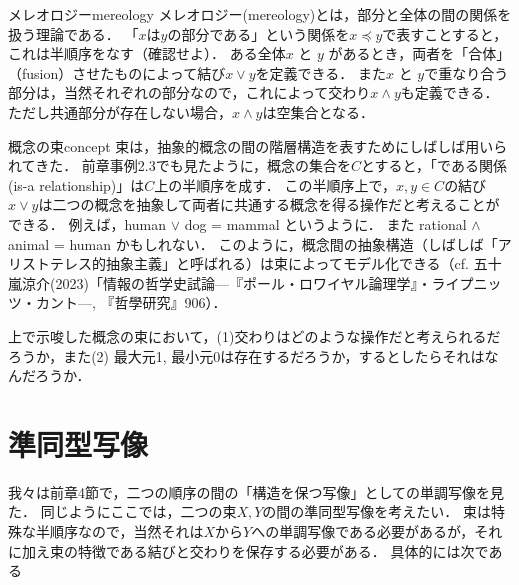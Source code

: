 \documentclass[11pt,a4paper, dvipdfmx]{jsarticle}
\begin{document}
\begin{rei}{メレオロジー}{mereology}
メレオロジー(mereology)とは，部分と全体の間の関係を扱う理論である．
「$x$は$y$の部分である」という関係を$x \preceq y$で表すことすると，これは半順序をなす（確認せよ）．
ある全体$x$ と $y$ があるとき，両者を「合体」（fusion）させたものによって結び$x \vee y$を定義できる．
また$x$ と $y$で重なり合う部分は，当然それぞれの部分なので，これによって交わり$x \wedge y$も定義できる．ただし共通部分が存在しない場合，$x \wedge y$は空集合となる．
\end{rei}

\begin{rei}{概念の束}{concept}
束は，抽象的概念の間の階層構造を表すためにしばしば用いられてきた．
前章事例2.3でも見たように，概念の集合を$C$とすると，「である関係(is-a relationship)」は$C$上の半順序を成す．
この半順序上で，$x, y \in C$の結び$x \vee y$は二つの概念を抽象して両者に共通する概念を得る操作だと考えることができる．
例えば，human $\vee$ dog = mammal というように．
また rational $\wedge$ animal = human かもしれない．
このように，概念間の抽象構造（しばしば「アリストテレス的抽象主義」と呼ばれる）は束によってモデル化できる（cf. 五十嵐涼介(2023)「情報の哲学史試論---『ポール・ロワイヤル論理学』・ライプニッツ・カント---, 『哲學研究』906）．
\end{rei}

\begin{renshu}{}{}
上で示唆した概念の束において，(1)交わりはどのような操作だと考えられるだろうか，また(2) 最大元1, 最小元0は存在するだろうか，するとしたらそれはなんだろうか．
\end{renshu}

\section{準同型写像}
我々は前章4節で，二つの順序の間の「構造を保つ写像」としての単調写像を見た．
同じようにここでは，二つの束$X, Y$の間の準同型写像を考えたい．
束は特殊な半順序なので，当然それは$X$から$Y$への単調写像である必要があるが，それに加え束の特徴である結びと交わりを保存する必要がある．
具体的には次である
\end{document}
